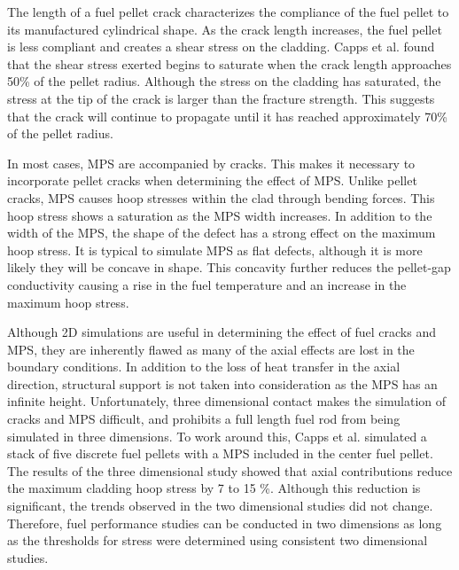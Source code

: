 \documentclass[edeposit,fullpage,11pt]{uiucthesis2009}
\begin{document}
The length of a fuel pellet crack characterizes the compliance of the fuel pellet to its manufactured cylindrical shape.
As the crack length increases, the fuel pellet is less compliant and creates a shear stress on the cladding.
Capps et al. found that the shear stress exerted begins to saturate when the crack length approaches 50\% of the pellet radius.
Although the stress on the cladding has saturated, the stress at the tip of the crack is larger than the fracture strength.
This suggests that the crack will continue to propagate until it has reached approximately 70\% of the pellet radius.

In most cases, \gls{MPS} are accompanied by cracks.
This makes it necessary to incorporate pellet cracks when determining the effect of \gls{MPS}.
Unlike pellet cracks, \gls{MPS} causes hoop stresses within the clad through bending forces.
This hoop stress shows a saturation as the \gls{MPS} width increases.
In addition to the width of the \gls{MPS}, the shape of the defect has a strong effect on the maximum hoop stress.
It is typical to simulate \gls{MPS} as flat defects, although it is more likely they will be concave in shape. 
This concavity further reduces the pellet-gap conductivity causing a rise in the fuel temperature and an increase in the maximum hoop stress.

Although 2D simulations are useful in determining the effect of fuel cracks and \gls{MPS}, they are inherently flawed as many of the axial effects are lost in the boundary conditions.
In addition to the loss of heat transfer in the axial direction, structural support is not taken into consideration as the \gls{MPS} has an infinite height.
Unfortunately, three dimensional contact makes the simulation of cracks and \gls{MPS} difficult, and prohibits a full length fuel rod from being simulated in three dimensions. 
To work around this, Capps et al. simulated a stack of five discrete fuel pellets with a \gls{MPS} included in the center fuel pellet.
The results of the three dimensional study showed that axial contributions reduce the maximum cladding hoop stress by 7 to 15 \%.
Although this reduction is significant, the trends observed in the two dimensional studies did not change.
Therefore, fuel performance studies can be conducted in two dimensions as long as the thresholds for stress were determined using consistent two dimensional studies.
\end{document}
